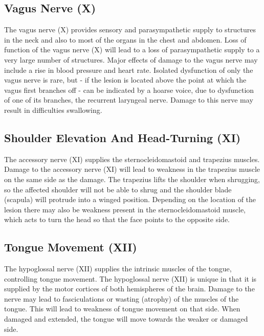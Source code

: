 \hypertarget{vagus-nerve-x}{%
\subsection{Vagus Nerve (X)}\label{vagus-nerve-x}}

The vagus nerve (X) provides sensory and parasympathetic supply to structures in the neck and also to most of the organs in the chest and abdomen. Loss of function of the vagus nerve (X) will lead to a loss of parasympathetic supply to a very large number of structures. Major effects of damage to the vagus nerve may include a rise in blood pressure and heart rate. Isolated dysfunction of only the vagus nerve is rare, but - if the lesion is located above the point at which the vagus first branches off - can be indicated by a hoarse voice, due to dysfunction of one of its branches, the recurrent laryngeal nerve. Damage to this nerve may result in difficulties swallowing.

\hypertarget{shoulder-elevation-and-head-turning-xi}{%
\subsection{Shoulder Elevation And Head-Turning (XI)}\label{shoulder-elevation-and-head-turning-xi}}

The accessory nerve (XI) supplies the sternocleidomastoid and trapezius muscles. Damage to the accessory nerve (XI) will lead to weakness in the trapezius muscle on the same side as the damage. The trapezius lifts the shoulder when shrugging, so the affected shoulder will not be able to shrug and the shoulder blade (scapula) will protrude into a winged position. Depending on the location of the lesion there may also be weakness present in the sternocleidomastoid muscle, which acts to turn the head so that the face points to the opposite side.

\hypertarget{tongue-movement-xii}{%
\subsection{Tongue Movement (XII)}\label{tongue-movement-xii}}

The hypoglossal nerve (XII) supplies the intrinsic muscles of the tongue, controlling tongue movement. The hypoglossal nerve (XII) is unique in that it is supplied by the motor cortices of both hemispheres of the brain. Damage to the nerve may lead to fasciculations or wasting (atrophy) of the muscles of the tongue. This will lead to weakness of tongue movement on that side. When damaged and extended, the tongue will move towards the weaker or damaged side.

